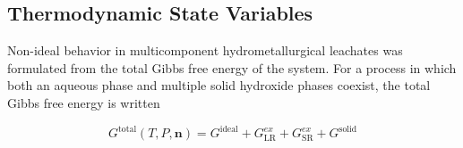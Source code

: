 \documentclass[final,2p,times]{elsarticle}
\begin{document}
\subsection{Thermodynamic State Variables}

Non-ideal behavior in multicomponent hydrometallurgical leachates was formulated from the total Gibbs free energy of the system. For a process in which both an aqueous phase and multiple solid hydroxide phases coexist, the total Gibbs free energy is written

\begin{equation}
G^{\text{total}}(T,P,\mathbf{n}) = G^{\text{ideal}} + G^{ex}_{\text{LR}} + G^{ex}_{\text{SR}} + G^{\text{solid}}
\label{eq:Gtotal}
\end{equation}
\end{document}
